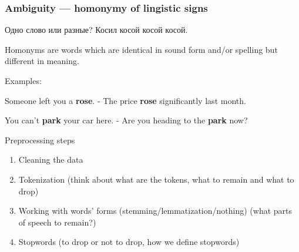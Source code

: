 \documentclass{beamer}
\begin{document}
\begin{frame}
  \frametitle{Ambiguity — homonymy of lingistic signs}
  \LARGE
  \begin{block}{Одно слово или разные?}
    Косил \alert<1>{косой косой косой}.
  \end{block}
\end{frame}

\begin{frame}
    Homonyms are words which are identical in sound form and/or spelling but different in meaning.

    Examples:

    \item Someone left you a \textbf{rose}. - The price \textbf{rose} significantly last month.
    \item You can't \textbf{park} your car here. - Are you heading to the \textbf{park} now?
\end{frame}

    \begin{frame}{Preprocessing steps}
        \begin{enumerate}
            \item Cleaning the data
            \item Tokenization (think about what are the tokens, what to remain and what to drop)
            \item Working with words' forms (stemming/lemmatization/nothing) (what parts of speech to remain?)
            \item Stopwords (to drop or not to drop, how we define stopwords)
        \end{enumerate}

    \end{frame}
\end{document}
